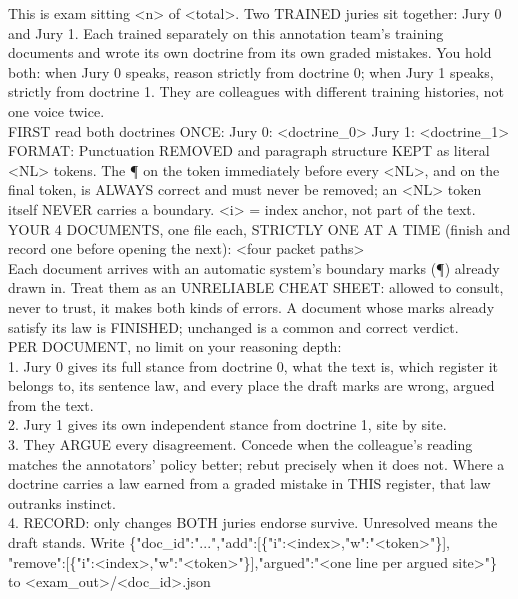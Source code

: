 \documentclass[11pt]{article}
\begin{document}
\begin{tcolorbox}[colback=white, boxrule=0.4pt, left=3pt, right=3pt, top=3pt, bottom=3pt]
\scriptsize\ttfamily\raggedright
This is exam sitting <n> of <total>. Two TRAINED juries sit together: Jury 0 and Jury 1.
Each trained separately on this annotation team's training documents and wrote its own
doctrine from its own graded mistakes. You hold both: when Jury 0 speaks, reason strictly
from doctrine 0; when Jury 1 speaks, strictly from doctrine 1. They are colleagues with
different training histories, not one voice twice.\\
FIRST read both doctrines ONCE: Jury 0: <doctrine\_0> Jury 1: <doctrine\_1>\\
FORMAT: Punctuation REMOVED and paragraph structure KEPT as literal <NL> tokens. The \P{}
on the token immediately before every <NL>, and on the final token, is ALWAYS correct and
must never be removed; an <NL> token itself NEVER carries a boundary. <i> = index anchor,
not part of the text.\\
YOUR 4 DOCUMENTS, one file each, STRICTLY ONE AT A TIME (finish and record one before
opening the next): <four packet paths>\\
Each document arrives with an automatic system's boundary marks (\P) already drawn in.
Treat them as an UNRELIABLE CHEAT SHEET: allowed to consult, never to trust, it makes both
kinds of errors. A document whose marks already satisfy its law is FINISHED; unchanged is
a common and correct verdict.\\
PER DOCUMENT, no limit on your reasoning depth:\\
1. Jury 0 gives its full stance from doctrine 0, what the text is, which register it
belongs to, its sentence law, and every place the draft marks are wrong, argued from the
text.\\
2. Jury 1 gives its own independent stance from doctrine 1, site by site.\\
3. They ARGUE every disagreement. Concede when the colleague's reading matches the
annotators' policy better; rebut precisely when it does not. Where a doctrine carries a
law earned from a graded mistake in THIS register, that law outranks instinct.\\
4. RECORD: only changes BOTH juries endorse survive. Unresolved means the draft stands.
Write \{"doc\_id":"...",\allowbreak "add":[\{"i":<index>,\allowbreak "w":"<token>"\}],\allowbreak
"remove":[\{"i":<index>,\allowbreak "w":"<token>"\}],\allowbreak "argued":"<one line per argued
site>"\} to <exam\_out>/<doc\_id>.json

\end{tcolorbox}
\end{document}
